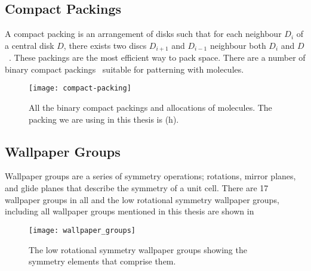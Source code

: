 \begin{appendix}

\chapter{}

\section{Compact Packings}
\label{sec:compact}

A compact packing is an arrangement of disks such that for each neighbour $D_i$ of a central disk $D$, there exists two discs $D_{i+1}$ and $D_{i-1}$ neighbour both $D_i$ and $D$~\cite{heppes:03,kennedy:06}. These packings are the most efficient way to pack space. There are a number of binary compact packings~ suitable for patterning with molecules.
\begin{figure}[htb]
    \texttt{[image: compact-packing]}
    \caption{All the binary compact packings and allocations of molecules. The packing we are using in this thesis is (h).}
    \label{fig:compact packing}
\end{figure}

\vspace{-3em}
\section{Wallpaper Groups}
\label{sec:wallpaper}

Wallpaper groups are a series of symmetry operations; rotations, mirror planes, and glide planes that describe the symmetry of a unit cell. There are 17 wallpaper groups in all and the low rotational symmetry wallpaper groups, including all wallpaper groups mentioned in this thesis are shown in 
\begin{figure}[hbt]
    \centering
    \texttt{[image: wallpaper\_groups]}
    \caption{The low rotational symmetry wallpaper groups showing the symmetry elements that comprise them.}
    \label{fig:wallpaper}
\end{figure}
\end{appendix}
